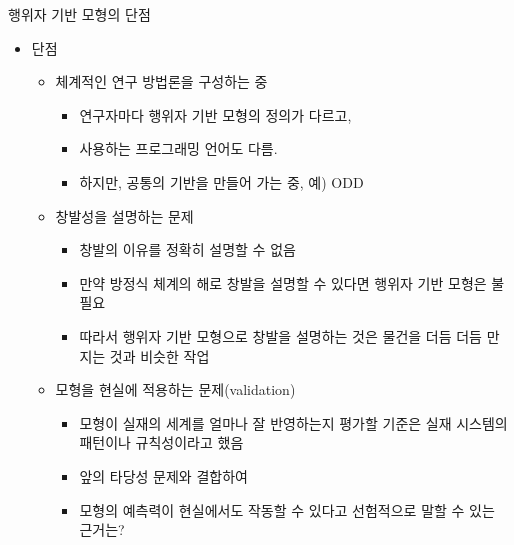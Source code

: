 \documentclass[hyperref={unicode}]{beamer}
\begin{document}
\begin{frame}{행위자 기반 모형의 단점}
\begin{itemize}
\item 단점
	\begin{itemize}
	\item 체계적인 연구 방법론을 구성하는 중
		\begin{itemize}
		\item 연구자마다 행위자 기반 모형의 정의가 다르고,
		\item 사용하는 프로그래밍 언어도 다름.
		\item 하지만, 공통의 기반을 만들어 가는 중, 예) ODD
		\end{itemize}
	\item 창발성을 설명하는 문제
		\begin{itemize}
		\item 창발의 이유를 정확히 설명할 수 없음
		\item 만약 방정식 체계의 해로 창발을 설명할 수 있다면 행위자 기반 모형은 불필요
		\item 따라서 행위자 기반 모형으로 창발을 설명하는 것은 물건을 더듬 더듬 만지는 것과 비슷한 작업
		\end{itemize}
	\item 모형을 현실에 적용하는 문제(validation)
		\begin{itemize}
		\item 모형이 실재의 세계를 얼마나 잘 반영하는지 평가할 기준은 실재 시스템의 패턴이나 규칙성이라고 했음
		\item 앞의 타당성 문제와 결합하여
		\item 모형의 예측력이 현실에서도 작동할 수 있다고 선험적으로 말할 수 있는 근거는?
		\end{itemize}
	\end{itemize}
\end{itemize}	
\end{frame}
\end{document}
